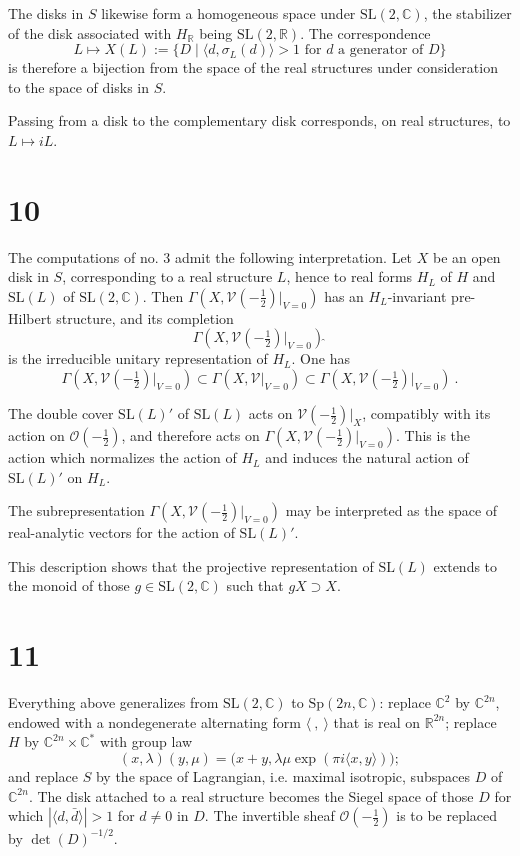 \documentclass[12pt,a4paper]{article}
\theoremstyle{plain}
\theoremstyle{definition}
\theoremstyle{remark}
\begin{document}
The disks in $S$ likewise form a homogeneous space under $\mathrm{SL}(2,\mathbb C)$, the stabilizer of the disk associated with $H_{\mathbb R}$ being $\mathrm{SL}(2,\mathbb R)$. The correspondence
\[
L\mapsto X(L):=\{D\mid \langle d,\sigma_L(d)\rangle>1\text{ for }d\text{ a generator of }D\}
\]
is therefore a bijection from the space of the real structures under consideration to the space of disks in $S$.

Passing from a disk to the complementary disk corresponds, on real structures, to $L\mapsto iL$.

\section*{10}

The computations of no. 3 admit the following interpretation. Let $X$ be an open disk in $S$, corresponding to a real structure $L$, hence to real forms $H_L$ of $H$ and $\mathrm{SL}(L)$ of $\mathrm{SL}(2,\mathbb C)$. Then $\Gamma(X,\mathscr V(-\frac12)|_{V=0})$ has an $H_L$-invariant pre-Hilbert structure, and its completion
\[
\Gamma(X,\mathscr V(-\tfrac12)|_{V=0})\widehat{\ }
\]
is the irreducible unitary representation of $H_L$. One has
\[
\Gamma(X,\mathscr V(-\tfrac12)|_{V=0})
\subset \Gamma(X,\mathscr V|_{V=0})
\subset \Gamma(X,\mathscr V(-\tfrac12)|_{V=0})\widehat{\ }.
\]

The double cover $\mathrm{SL}(L)'$ of $\mathrm{SL}(L)$ acts on $\mathscr V(-\frac12)|_X$, compatibly with its action on $\mathcal O(-\frac12)$, and therefore acts on $\Gamma(X,\mathscr V(-\frac12)|_{V=0})$. This is the action which normalizes the action of $H_L$ and induces the natural action of $\mathrm{SL}(L)'$ on $H_L$.

The subrepresentation $\Gamma(X,\mathscr V(-\frac12)|_{V=0})$ may be interpreted as the space of real-analytic vectors for the action of $\mathrm{SL}(L)'$.

This description shows that the projective representation of $\mathrm{SL}(L)$ extends to the monoid of those $g\in \mathrm{SL}(2,\mathbb C)$ such that $gX\supset X$.

\section*{11}

Everything above generalizes from $\mathrm{SL}(2,\mathbb C)$ to $\mathrm{Sp}(2n,\mathbb C)$: replace $\mathbb C^2$ by $\mathbb C^{2n}$, endowed with a nondegenerate alternating form $\langle\ ,\ \rangle$ that is real on $\mathbb R^{2n}$; replace $H$ by $\mathbb C^{2n}\times \mathbb C^*$ with group law
\[
(x,\lambda)(y,\mu)=\bigl(x+y,\lambda\mu\exp(\pi i\langle x,y\rangle)\bigr);
\]
and replace $S$ by the space of Lagrangian, i.e. maximal isotropic, subspaces $D$ of $\mathbb C^{2n}$. The disk attached to a real structure becomes the Siegel space of those $D$ for which $|\langle d,\bar d\rangle|>1$ for $d\neq 0$ in $D$. The invertible sheaf $\mathcal O(-\frac12)$ is to be replaced by $\det(D)^{-1/2}$.
\end{document}
